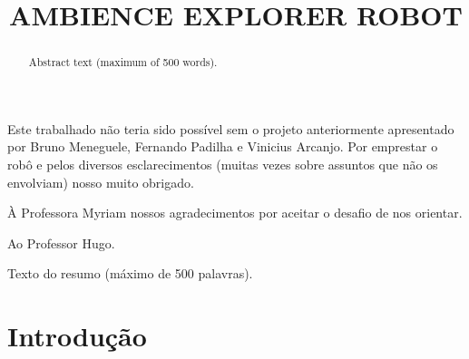 \documentclass[oneside]{normas-utf-tex} %
\title{\MakeUppercase{Ambience Explorer Robot}} %
\begin{document}
\capa %
\folhaderosto %


\begin{agradecimentos}
Este trabalhado não teria sido possível sem o projeto anteriormente apresentado por Bruno Meneguele, Fernando Padilha e Vinicius Arcanjo.
Por emprestar o robô e pelos diversos esclarecimentos (muitas vezes sobre assuntos que não os envolviam) nosso muito obrigado.

À Professora Myriam nossos agradecimentos por aceitar o desafio de nos orientar. 

Ao Professor Hugo.
 
\end{agradecimentos}


\begin{resumo}
Texto do resumo (m\'aximo de 500 palavras).
\end{resumo}

\begin{abstract}
Abstract text (maximum of 500 words).
\end{abstract}

\listadefiguras %
\listadetabelas %
\listadesiglas %
\listadesimbolos %

\sumario %


%
%
%
%


\chapter{Introdu\c{c}\~ao}
\end{document}
